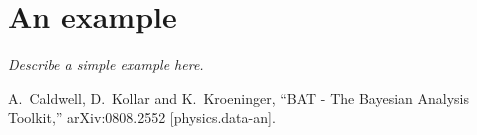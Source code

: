 \documentclass[11pt, a4paper]{article}
\begin{document}
\section{An example} 
\label{section:example}

{\it Describe a simple example here. } 



\begin{thebibliography}{99}
  A.~Caldwell, D.~Kollar and K.~Kroeninger,
  ``BAT - The Bayesian Analysis Toolkit,''
  arXiv:0808.2552 [physics.data-an].
\end{thebibliography}

\end{document}
